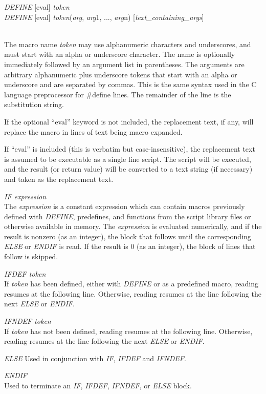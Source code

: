 \begin{description}
\item\parbox[b]{4in}{\rr
{\it DEFINE} [{\vt eval}] {\it token}\\
{\it DEFINE} [{\vt eval}] {\it token}({\it arg\/},
  {\it arg\/}1, ..., {\it arg\/}n) [{\it text\_containing\_args}]\\
}\\
The macro name {\it token} may use alphanumeric characters and
underscores, and must start with an alpha or underscore character. 
The name is optionally immediately followed by an argument list in
parentheses.  The arguments are arbitrary alphanumeric plus underscore
tokens that start with an alpha or underscore and are separated by
commas.  This is the same syntax used in the C language preprocessor
for {\vt \#define} lines.  The remainder of the line is the
substitution string.

If the optional ``{\vt eval}'' keyword is not included, the
replacement text, if any, will replace the macro in lines of text
being macro expanded.

If ``{\vt eval}'' is included (this is verbatim but case-insensitive),
the replacement text is assumed to be executable as a single line
script.  The script will be executed, and the result (or return value)
will be converted to a text string (if necessary) and taken as the
replacement text.

\item{\it IF expression}\\
The {\it expression} is a constant expression which can contain macros
previously defined with {\it DEFINE}, predefines, and functions from
the script library files or otherwise available in memory.  The {\it
expression} is evaluated numerically, and if the result is nonzero (as
an integer), the block that follows until the corresponding {\it ELSE}
or {\it ENDIF} is read.  If the result is 0 (as an integer), the block
of lines that follow is skipped.

\item{\it IFDEF token}\\
If {\it token} has been defined, either with {\it DEFINE} or as a
predefined macro, reading resumes at the following line.  Otherwise,
reading resumes at the line following the next {\it ELSE} or {\it
ENDIF\/}.

\item{\it IFNDEF token}\\
If {\it token} has not been defined, reading resumes at the
following line.  Otherwise, reading resumes at the line following
the next {\it ELSE} or {\it ENDIF\/}.

\item{\it ELSE}
Used in conjunction with {\it IF}, {\it IFDEF} and {\it IFNDEF\/}.

\item{\it ENDIF}\\
Used to terminate an {\it IF}, {\it IFDEF}, {\it IFNDEF\/}, or
{\it ELSE} block.
\end{description}

